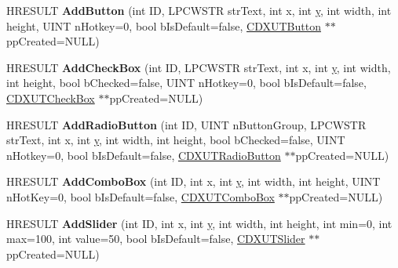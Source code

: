 \begin{DoxyCompactItemize}
\item 
\hypertarget{class_c_d_x_u_t_dialog_acc5e5c07e3dbbb843a18d4974273d169}{H\+R\+E\+S\+U\+L\+T {\bfseries Add\+Button} (int I\+D, L\+P\+C\+W\+S\+T\+R str\+Text, int x, int \hyperlink{_ice_utils_8h_aa7ffaed69623192258fb8679569ff9ba}{y}, int width, int height, U\+I\+N\+T n\+Hotkey=0, bool b\+Is\+Default=false, \hyperlink{class_c_d_x_u_t_button}{C\+D\+X\+U\+T\+Button} $\ast$$\ast$pp\+Created=N\+U\+L\+L)}\label{class_c_d_x_u_t_dialog_acc5e5c07e3dbbb843a18d4974273d169}

\item 
\hypertarget{class_c_d_x_u_t_dialog_a9b69134b9abab06bcf3e449ad7323733}{H\+R\+E\+S\+U\+L\+T {\bfseries Add\+Check\+Box} (int I\+D, L\+P\+C\+W\+S\+T\+R str\+Text, int x, int \hyperlink{_ice_utils_8h_aa7ffaed69623192258fb8679569ff9ba}{y}, int width, int height, bool b\+Checked=false, U\+I\+N\+T n\+Hotkey=0, bool b\+Is\+Default=false, \hyperlink{class_c_d_x_u_t_check_box}{C\+D\+X\+U\+T\+Check\+Box} $\ast$$\ast$pp\+Created=N\+U\+L\+L)}\label{class_c_d_x_u_t_dialog_a9b69134b9abab06bcf3e449ad7323733}

\item 
\hypertarget{class_c_d_x_u_t_dialog_a855c97f014a3a6c63706cf300527a817}{H\+R\+E\+S\+U\+L\+T {\bfseries Add\+Radio\+Button} (int I\+D, U\+I\+N\+T n\+Button\+Group, L\+P\+C\+W\+S\+T\+R str\+Text, int x, int \hyperlink{_ice_utils_8h_aa7ffaed69623192258fb8679569ff9ba}{y}, int width, int height, bool b\+Checked=false, U\+I\+N\+T n\+Hotkey=0, bool b\+Is\+Default=false, \hyperlink{class_c_d_x_u_t_radio_button}{C\+D\+X\+U\+T\+Radio\+Button} $\ast$$\ast$pp\+Created=N\+U\+L\+L)}\label{class_c_d_x_u_t_dialog_a855c97f014a3a6c63706cf300527a817}

\item 
\hypertarget{class_c_d_x_u_t_dialog_a5027ee1afa698e4273b44af289451d8e}{H\+R\+E\+S\+U\+L\+T {\bfseries Add\+Combo\+Box} (int I\+D, int x, int \hyperlink{_ice_utils_8h_aa7ffaed69623192258fb8679569ff9ba}{y}, int width, int height, U\+I\+N\+T n\+Hot\+Key=0, bool b\+Is\+Default=false, \hyperlink{class_c_d_x_u_t_combo_box}{C\+D\+X\+U\+T\+Combo\+Box} $\ast$$\ast$pp\+Created=N\+U\+L\+L)}\label{class_c_d_x_u_t_dialog_a5027ee1afa698e4273b44af289451d8e}

\item 
\hypertarget{class_c_d_x_u_t_dialog_aaaaade0b42673d6b6a5a244fe4ae25ee}{H\+R\+E\+S\+U\+L\+T {\bfseries Add\+Slider} (int I\+D, int x, int \hyperlink{_ice_utils_8h_aa7ffaed69623192258fb8679569ff9ba}{y}, int width, int height, int min=0, int max=100, int value=50, bool b\+Is\+Default=false, \hyperlink{class_c_d_x_u_t_slider}{C\+D\+X\+U\+T\+Slider} $\ast$$\ast$pp\+Created=N\+U\+L\+L)}\label{class_c_d_x_u_t_dialog_aaaaade0b42673d6b6a5a244fe4ae25ee}


\end{DoxyCompactItemize}
